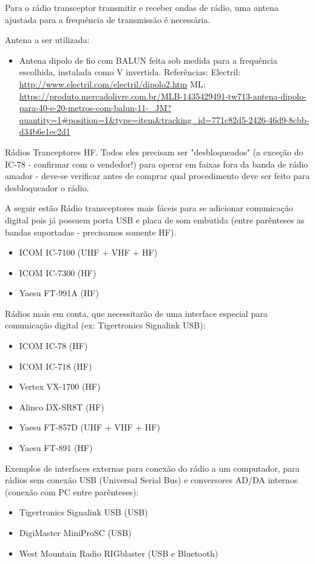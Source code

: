 \documentclass[11pt,a4paper]{article}
\begin{document}
Para o rádio transceptor transmitir e receber ondas de rádio, uma antena ajustada para a frequência de transmissão é necessária.

Antena a ser utilizada:
\begin{itemize}
\item Antena dipolo de fio com BALUN feita sob medida para a frequência escolhida, instalada como V invertida. Referências: Electril:     \url{http://www.electril.com/electril/dipolo2.htm} ML: \url{https://produto.mercadolivre.com.br/MLB-1435429491-tw713-antena-dipolo-para-40-e-20-metros-com-balun-11-_JM?quantity=1#position=1&type=item&tracking_id=771c82d5-2426-46d9-8cbb-d34b6e1ec2d1}
\end{itemize}

Rádios Tranceptores HF. Todos eles precisam ser "desbloqueados" (a exceção do IC-78 - confirmar com o vendedor!) para operar em faixas fora da banda de rádio amador - deve-se verificar antes de comprar qual procedimento deve ser feito para desbloqueador o rádio. 

A seguir estão Rádio transceptores mais fáceis para se adicionar comunicação digital pois já possuem porta USB e placa de som embutida (entre parênteses as bandas suportadas - precisamos somente HF).

\begin{itemize}
\item ICOM IC-7100 (UHF + VHF + HF)
\item ICOM IC-7300 (HF)
\item Yaesu FT-991A (HF)
\end{itemize}

Rádios mais em conta, que necessitarão de uma interface especial para comunicação digital (ex: Tigertronics Signalink USB):
\begin{itemize}
\item ICOM IC-78 (HF)
\item ICOM IC-718 (HF)
\item Vertex VX-1700 (HF)
\item Alinco DX-SR8T (HF)
\item Yaesu FT-857D (UHF + VHF + HF)
\item Yaesu FT-891 (HF)
\end{itemize}

Exemplos de interfaces externas para conexão do rádio a um computador, para rádios sem conexão USB (Universal Serial Bus) e conversores AD/DA internos (conexão com PC entre parênteses):
\begin{itemize}
\item Tigertronics Signalink USB (USB)
\item DigiMaster MiniProSC (USB)
\item West Mountain Radio RIGblaster (USB e Bluetooth)
\end{itemize}
\end{document}
